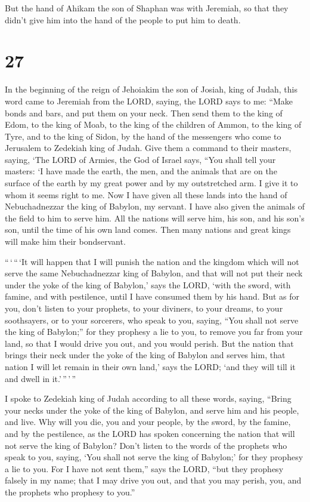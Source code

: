  But the hand of Ahikam the son of Shaphan was with
Jeremiah, so that they didn't give him into the hand of the people to
put him to death.

\hypertarget{section-26}{%
\section{27}\label{section-26}}

 In the beginning of the reign of Jehoiakim the son of
Josiah, king of Judah, this word came to Jeremiah from the LORD, saying,
 the LORD says to me: ``Make bonds and bars, and put them on
your neck.  Then send them to the king of Edom, to the king
of Moab, to the king of the children of Ammon, to the king of Tyre, and
to the king of Sidon, by the hand of the messengers who come to
Jerusalem to Zedekiah king of Judah.  Give them a command to
their masters, saying, `The LORD of Armies, the God of Israel says,
``You shall tell your masters:  `I have made the earth, the
men, and the animals that are on the surface of the earth by my great
power and by my outstretched arm. I give it to whom it seems right to
me.  Now I have given all these lands into the hand of
Nebuchadnezzar the king of Babylon, my servant. I have also given the
animals of the field to him to serve him.  All the nations
will serve him, his son, and his son's son, until the time of his own
land comes. Then many nations and great kings will make him their
bondservant.

 ``\,`\,``\,`It will happen that I will punish the nation
and the kingdom which will not serve the same Nebuchadnezzar king of
Babylon, and that will not put their neck under the yoke of the king of
Babylon,' says the LORD, `with the sword, with famine, and with
pestilence, until I have consumed them by his hand.  But as
for you, don't listen to your prophets, to your diviners, to your
dreams, to your soothsayers, or to your sorcerers, who speak to you,
saying, ``You shall not serve the king of Babylon;''  for
they prophesy a lie to you, to remove you far from your land, so that I
would drive you out, and you would perish.  But the nation
that brings their neck under the yoke of the king of Babylon and serves
him, that nation I will let remain in their own land,' says the LORD;
`and they will till it and dwell in it.'\,''\,'\,''

 I spoke to Zedekiah king of Judah according to all these
words, saying, ``Bring your necks under the yoke of the king of Babylon,
and serve him and his people, and live.  Why will you die,
you and your people, by the sword, by the famine, and by the pestilence,
as the LORD has spoken concerning the nation that will not serve the
king of Babylon?  Don't listen to the words of the prophets
who speak to you, saying, `You shall not serve the king of Babylon;' for
they prophesy a lie to you.  For I have not sent them,''
says the LORD, ``but they prophesy falsely in my name; that I may drive
you out, and that you may perish, you, and the prophets who prophesy to
you.''


